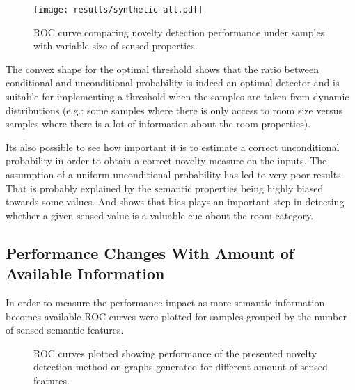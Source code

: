 \begin{figure}[h]
\centering
\texttt{[image: results/synthetic-all.pdf]}

\caption{\label{fig:synthetic-roc}ROC curve comparing novelty detection performance
         under samples with variable size of sensed properties.}
\end{figure}

The convex shape for the optimal threshold shows that the ratio between conditional
and unconditional probability is indeed an optimal detector and is suitable for
implementing a threshold when the samples are taken from dynamic
distributions (e.g.: some samples where there is only access to room size versus
samples where there is a lot of information about the room properties).

Its also possible to see how important it is to estimate a correct unconditional
probability in order to obtain a correct novelty measure on the inputs.
The assumption of a uniform unconditional probability has led to very poor results.
That is probably explained by the semantic properties being highly
biased towards some values. And shows that bias plays an important step
in detecting whether a given sensed value is a valuable cue about the room category.



\subsection{Performance Changes With Amount of Available Information}
In order to measure the performance impact as more semantic information becomes
available ROC curves were plotted for samples grouped by the number of sensed
semantic features.

\begin{figure}[h]
\centering

\qquad
{}

\qquad
{}

\caption{\label{fig:synthetic-roc-breakdown}ROC curves plotted showing performance of the
         presented novelty detection method on graphs generated for different amount of
         sensed features.}
\end{figure}

